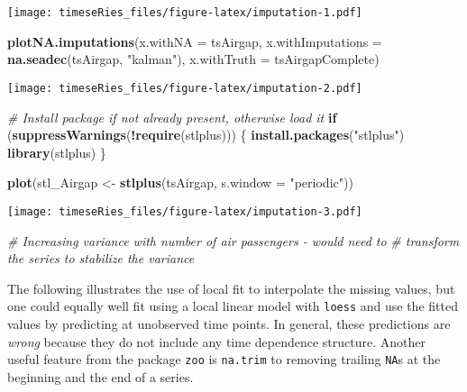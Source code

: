 \documentclass[]{book}
\newenvironment{Shaded}{\begin{snugshade}}{\end{snugshade}}
\newcommand{\KeywordTok}[1]{\textcolor[rgb]{0.13,0.29,0.53}{\textbf{#1}}}
\newcommand{\DataTypeTok}[1]{\textcolor[rgb]{0.13,0.29,0.53}{#1}}
\newcommand{\StringTok}[1]{\textcolor[rgb]{0.31,0.60,0.02}{#1}}
\newcommand{\CommentTok}[1]{\textcolor[rgb]{0.56,0.35,0.01}{\textit{#1}}}
\newcommand{\ControlFlowTok}[1]{\textcolor[rgb]{0.13,0.29,0.53}{\textbf{#1}}}
\newcommand{\OperatorTok}[1]{\textcolor[rgb]{0.81,0.36,0.00}{\textbf{#1}}}
\newcommand{\NormalTok}[1]{#1}
\begin{document}
\texttt{[image: timeseRies\_files/figure-latex/imputation-1.pdf]}

\begin{Shaded}
\begin{Highlighting}[]
\KeywordTok{plotNA.imputations}\NormalTok{(}\DataTypeTok{x.withNA =}\NormalTok{ tsAirgap, }\DataTypeTok{x.withImputations =} \KeywordTok{na.seadec}\NormalTok{(tsAirgap, }
    \StringTok{"kalman"}\NormalTok{), }\DataTypeTok{x.withTruth =}\NormalTok{ tsAirgapComplete)}
\end{Highlighting}
\end{Shaded}

\texttt{[image: timeseRies\_files/figure-latex/imputation-2.pdf]}

\begin{Shaded}
\begin{Highlighting}[]
\CommentTok{# Install package if not already present, otherwise load it}
\ControlFlowTok{if}\NormalTok{ (}\KeywordTok{suppressWarnings}\NormalTok{(}\OperatorTok{!}\KeywordTok{require}\NormalTok{(stlplus))) \{}
    \KeywordTok{install.packages}\NormalTok{(}\StringTok{"stlplus"}\NormalTok{)}
    \KeywordTok{library}\NormalTok{(stlplus)}
\NormalTok{\}}

\KeywordTok{plot}\NormalTok{(stl_Airgap <-}\StringTok{ }\KeywordTok{stlplus}\NormalTok{(tsAirgap, }\DataTypeTok{s.window =} \StringTok{"periodic"}\NormalTok{))}
\end{Highlighting}
\end{Shaded}

\texttt{[image: timeseRies\_files/figure-latex/imputation-3.pdf]}

\begin{Shaded}
\begin{Highlighting}[]
\CommentTok{# Increasing variance with number of air passengers - would need to}
\CommentTok{# transform the series to stabilize the variance}
\end{Highlighting}
\end{Shaded}

The following illustrates the use of local fit to interpolate the
missing values, but one could equally well fit using a local linear
model with \texttt{loess} and use the fitted values by predicting at
unobserved time points. In general, these predictions are \emph{wrong}
because they do not include any time dependence structure. Another
useful feature from the package \texttt{zoo} is \texttt{na.trim} to
removing trailing \texttt{NA}s at the beginning and the end of a series.
\end{document}

